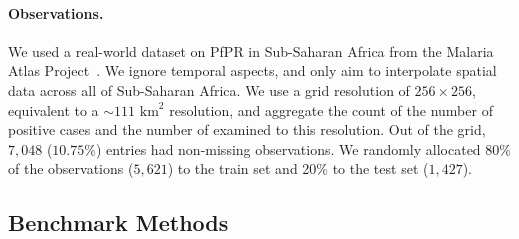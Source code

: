 \paragraph{Observations.}
We used a real-world dataset on PfPR in Sub-Saharan Africa from the Malaria Atlas Project~\citep{Bhatt2015-uk,Pfeffer2018-cm,Weiss2019-au}. 
We ignore temporal aspects, and only aim to interpolate spatial data across all of Sub-Saharan Africa. We use a grid resolution of $256 \times 256$, equivalent to a $\sim 111 \text{ km}^2$ resolution, and aggregate the count of the number of positive cases and the number of examined to this resolution. Out of the grid, $7,048$ ($10.75$\%) entries had non-missing observations. We randomly allocated 80\% of the observations ($5,621$) to the train set and 20\% to the test set ($1,427$). 





\subsection{Benchmark Methods}
\label{app-benchmark}

